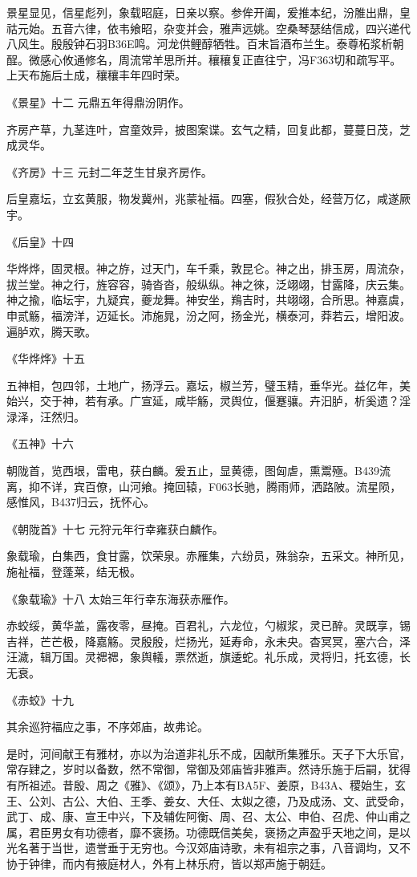 \documentclass[]{article}
\begin{document}
景星显见，信星彪列，象载昭庭，日亲以察。参侔开阖，爰推本纪，汾脽出鼎，皇祜元始。五音六律，依韦飨昭，杂变并会，雅声远姚。空桑琴瑟结信成，四兴递代八风生。殷殷钟石羽B36E鸣。河龙供鲤醇牺牲。百末旨酒布兰生。泰尊柘浆析朝酲。微感心攸通修名，周流常羊思所并。穰穰复正直往宁，冯F363切和疏写平。上天布施后土成，穰穰丰年四时荣。

《景星》十二 元鼎五年得鼎汾阴作。

齐房产草，九茎连叶，宫童效异，披图案谍。玄气之精，回复此都，蔓蔓日茂，芝成灵华。

《齐房》十三 元封二年芝生甘泉齐房作。

后皇嘉坛，立玄黄服，物发冀州，兆蒙祉福。四塞，假狄合处，经营万亿，咸遂厥宇。

《后皇》十四

华烨烨，固灵根。神之斿，过天门，车千乘，敦昆仑。神之出，排玉房，周流杂，拔兰堂。神之行，旌容容，骑沓沓，般纵纵。神之徠，泛翊翊，甘露降，庆云集。神之揄，临坛宇，九疑宾，夔龙舞。神安坐，鴹吉时，共翊翊，合所思。神嘉虞，申贰觞，福滂洋，迈延长。沛施晁，汾之阿，扬金光，横泰河，莽若云，增阳波。遍胪欢，腾天歌。

《华烨烨》十五

五神相，包四邻，土地广，扬浮云。嘉坛，椒兰芳，璧玉精，垂华光。益亿年，美始兴，交于神，若有承。广宣延，咸毕觞，灵舆位，偃蹇骧。卉汩胪，析奚遗？淫渌泽，汪然归。

《五神》十六

朝陇首，览西垠，雷电，获白麟。爰五止，显黄德，图匈虐，熏鬻殛。B439流离，抑不详，宾百僚，山河飨。掩回辕，F063长驰，腾雨师，洒路陂。流星陨，感惟风，B437归云，抚怀心。

《朝陇首》十七 元狩元年行幸雍获白麟作。

象载瑜，白集西，食甘露，饮荣泉。赤雁集，六纷员，殊翁杂，五采文。神所见，施祉福，登蓬莱，结无极。

《象载瑜》十八 太始三年行幸东海获赤雁作。

赤蛟绥，黄华盖，露夜零，昼掩。百君礼，六龙位，勺椒浆，灵已醉。灵既享，锡吉祥，芒芒极，降嘉觞。灵殷殷，烂扬光，延寿命，永未央。杳冥冥，塞六合，泽汪濊，辑万国。灵禗禗，象舆轙，票然逝，旗逶蛇。礼乐成，灵将归，托玄德，长无衰。

《赤蛟》十九

其余巡狩福应之事，不序郊庙，故弗论。

是时，河间献王有雅材，亦以为治道非礼乐不成，因献所集雅乐。天子下大乐官，常存肄之，岁时以备数，然不常御，常御及郊庙皆非雅声。然诗乐施于后嗣，犹得有所祖述。昔殷、周之《雅》、《颂》，乃上本有BA5F、姜原，B43A、稷始生，玄王、公刘、古公、大伯、王季、姜女、大任、太姒之德，乃及成汤、文、武受命，武丁、成、康、宣王中兴，下及辅佐阿衡、周、召、太公、申伯、召虎、仲山甫之属，君臣男女有功德者，靡不褒扬。功德既信美矣，褒扬之声盈乎天地之间，是以光名著于当世，遗誉垂于无穷也。今汉郊庙诗歌，未有祖宗之事，八音调均，又不协于钟律，而内有掖庭材人，外有上林乐府，皆以郑声施于朝廷。
\end{document}
